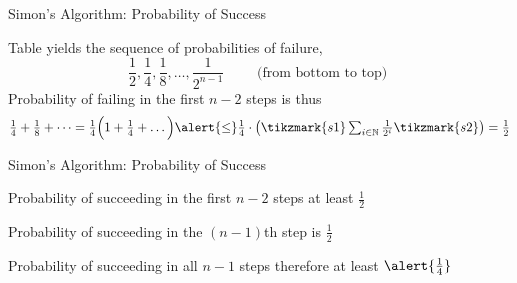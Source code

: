 \documentclass{beamer}
\begin{document}
\begin{frame}{Simon's Algorithm: Probability of Success}
        \begin{center}
        \end{center}

        Table yields the sequence of probabilities of failure,
        \[
                \textstyle{
                        \frac{1}{2}, \frac{1}{4}, \frac{1}{8}, \dots, \frac{1}{2^{n-1}}
                }
                \qquad
                \text{ (from bottom to top) }
        \]
        Probability of failing in the first $n-2$ steps is thus 
        \[
                \textstyle{
                \frac{1}{4} + \frac{1}{8} + \dots = 
                \frac{1}{4} \Big (1 + \frac{1}{4} + \dots \Big ) \alert{\leq}
                \frac{1}{4} \cdot \left ( \tikzmark{s1} \sum_{i \in \mathbb{N}} \frac{1}{2^i}
                \tikzmark{s2} \right )
                = \frac{1}{2}
                }
        \]

\end{frame}

\begin{frame}{Simon's Algorithm: Probability of Success}

       Probability of succeeding in the first $n-2$ steps at least $\frac{1}{2}$

       Probability of succeeding in the $(n-1)$th step is $\frac{1}{2}$

       Probability of succeeding in all $n-1$ steps therefore at least $\alert{\frac{1}{4}}$
\end{frame}
\end{document}

